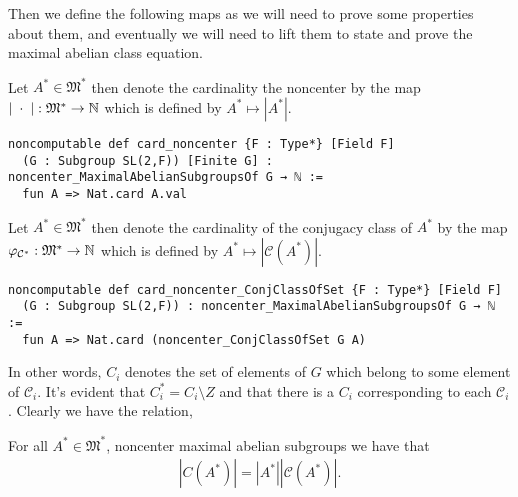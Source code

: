 Then we define the following maps as we will need to prove some properties about them, and eventually we will need to lift them to
state and prove the maximal abelian class equation.


\begin{definition}
  \label{card_noncenter}
  \leanok
  Let $A^* \in \mathfrak{M}^*$ then denote the cardinality the noncenter 
  by the map $| \; \cdot \; | : \mathfrak{M}^* \rightarrow \mathbb{N}$ which is defined by $A^* \mapsto |A^*|$.
\end{definition}
\begin{footnotesize}
\begin{verbatim}
noncomputable def card_noncenter {F : Type*} [Field F]
  (G : Subgroup SL(2,F)) [Finite G] : noncenter_MaximalAbelianSubgroupsOf G → ℕ :=
  fun A => Nat.card A.val
\end{verbatim}
\end{footnotesize}

\begin{definition}
  \label{card_noncenter_ConjClassOfSet}
  \leanok
  Let $A^* \in \mathfrak{M}^*$ then denote the cardinality of the conjugacy class of $A^*$
  by the map $\varphi_{\mathcal{C}^*} : \mathfrak{M}^* \rightarrow \mathbb{N}$  which is defined by $A^* \mapsto |\mathcal{C}(A^*)|$.
\end{definition}
\begin{footnotesize}
\begin{verbatim}
noncomputable def card_noncenter_ConjClassOfSet {F : Type*} [Field F]
  (G : Subgroup SL(2,F)) : noncenter_MaximalAbelianSubgroupsOf G → ℕ :=
  fun A => Nat.card (noncenter_ConjClassOfSet G A)
\end{verbatim}
\end{footnotesize}

In other words, $C_i$ denotes the set of elements of $G$ which belong to some element of $\mathcal{C}_i$. It's evident that $C_i^* = C_i \setminus Z$ and that there is a $C_i$ corresponding to each $\mathcal{C}_i$. Clearly we have the relation,
\begin{lemma}
\label{card_noncenter_C_eq_noncenter_MaximalAbelianSubgroup_mul_noncenter_ConjClassOfSet}
\leanok
For all $A^* \in \mathfrak{M}^*$, noncenter maximal abelian subgroups we have that
\begin{align} 
  |C(A^*)| = |A^*||\mathcal{C}(A^*)|.
\end{align}
\end{lemma}

